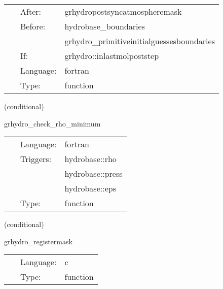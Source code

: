 \documentclass{article}
\begin{document}
\hspace{5mm}

 \begin{tabular*}{160mm}{cll} 
~ & After:  & grhydropostsyncatmospheremask \\ 
~ & Before:  & hydrobase\_boundaries \\ 
~& ~ &grhydro\_primitiveinitialguessesboundaries\\ 
~ & If:  & grhydro::inlastmolpoststep \\ 
~ & Language:  & fortran \\ 
~ & Type:  & function \\ 
\end{tabular*} 


\vspace{5mm}

   (conditional) 

\hspace{5mm} grhydro\_check\_rho\_minimum 



\hspace{5mm}

 \begin{tabular*}{160mm}{cll} 
~ & Language:  & fortran \\ 
~ & Triggers:  & hydrobase::rho \\ 
~& ~ &hydrobase::press\\ 
~& ~ &hydrobase::eps\\ 
~ & Type:  & function \\ 
\end{tabular*} 


\vspace{5mm}

   (conditional) 

\hspace{5mm} grhydro\_registermask 

\hspace{5mm}{\it register the hydro masks } 


\hspace{5mm}

 \begin{tabular*}{160mm}{cll} 
~ & Language:  & c \\ 
~ & Type:  & function \\ 
\end{tabular*} 
\end{document}
